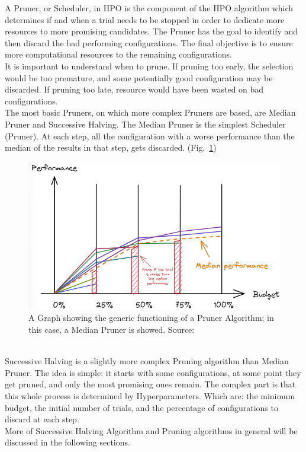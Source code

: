 A Pruner, or Scheduler, in HPO is the component of the HPO algorithm which determines if and when a trial needs to be stopped in order to dedicate more resources to more promising candidates.
The Pruner has the goal to identify and then discard the bad performing configurations.
The final objective is to ensure more computational resources to the remaining configurations.
\\[0.3cm]It is important to understand when to prune. If pruning too early, the selection would be too premature, and some potentially good configuration may be discarded. If pruning too late, resource would have been wasted on bad configurations.
\\[0.3cm]The most basic Pruners, on which more complex Pruners are based, are Median Pruner and Successive Halving.
The Median Pruner is the simplest Scheduler (Pruner). At each step, all the configuration with a worse performance than the median of the results in that step, gets discarded. (Fig.~\ref{fig:figure-2.1.2})
\begin{figure}[t]
	\centering
	\includegraphics[width=12cm]{figures/figure-2.1.2.png}
	\caption[Pruning Algorithm]{A Graph showing the generic functioning of a Pruner Algorithm; in this case, a Median Pruner is showed. Source:~\cite{Tesi-1.3}}
	\label{fig:figure-2.1.2}
\end{figure}
\\[0.3cm]Successive Halving is a slightly more complex Pruning algorithm than Median Pruner. The idea is simple: it starts with some configurations, at some point they get pruned, and only the most promising ones remain. The complex part is that this whole process is determined by Hyperparameters. Which are: the minimum budget, the initial number of trials, and the percentage of configurations to discard at each step.
\\More of Successive Halving Algorithm and Pruning algorithms in general will be discussed in the following sections.

